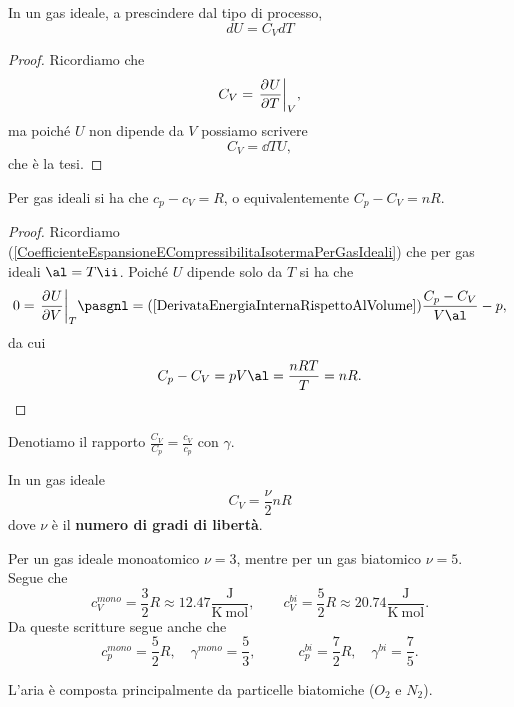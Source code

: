 \begin{corollary}
In un gas ideale, a prescindere dal tipo di processo,
\[\boxed{dU=C_V dT}\]
\end{corollary}
\begin{proof}
Ricordiamo che
\[C_V=\ppb TUV,\]
ma poich\'e $U$ non dipende da $V$ possiamo scrivere
\[C_V=\dd TU,\]
che \`e la tesi.
\end{proof}

\begin{proposition}\label{RelazioneMayer}
Per gas ideali si ha che $c_p-c_V=R$, o equivalentemente $C_p-C_V=nR$.
\end{proposition}
\begin{proof}
Ricordiamo (\ref{CoefficienteEspansioneECompressibilitaIsotermaPerGasIdeali}) che per gas ideali $\al=T\ii$. Poich\'e $U$ dipende solo da $T$ si ha che
\[0=\ppb VUT\pasgnl={(\ref{DerivataEnergiaInternaRispettoAlVolume})}\frac{C_p-C_V}{V\al}-p,\]
da cui
\[C_p-C_V=pV\al=\frac{nRT}T=nR.\]
\end{proof}

\begin{notation}
Denotiamo il rapporto $\frac{C_V}{C_p}=\frac{c_V}{c_p}$ con $\gamma$.
\end{notation}



\begin{fact}
In un gas ideale
\[C_V=\frac\nu2nR\]
dove $\nu$ \`e il \textbf{numero di gradi di libert\`a}.
\end{fact}
\begin{remark}
Per un gas ideale monoatomico $\nu=3$, mentre per un gas biatomico $\nu=5$.\\
Segue che
\[c_V^{mono}=\frac32R\approx 12.47\frac{\mathrm{J}}{\mathrm{K\ mol}},\qquad c_V^{bi}=\frac52R\approx 20.74\frac{\mathrm{J}}{\mathrm{K\ mol}}.\]
Da queste scritture segue anche che
\[c_p^{mono}=\frac52R,\quad \gamma^{mono}=\frac53,\quad\qquad c_p^{bi}=\frac72R,\quad \gamma^{bi}=\frac75.\]
\end{remark}

\begin{remark}
L'aria \`e composta principalmente da particelle biatomiche ($O_2$ e $N_2$).
\end{remark}

